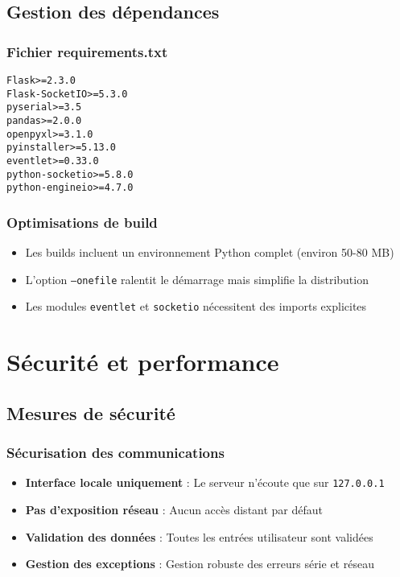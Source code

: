 \documentclass[12pt,a4paper]{article}
\begin{document}
\subsection{Gestion des dépendances}

\subsubsection{Fichier requirements.txt}

\begin{lstlisting}[caption=Dépendances Python]
Flask>=2.3.0
Flask-SocketIO>=5.3.0
pyserial>=3.5
pandas>=2.0.0
openpyxl>=3.1.0
pyinstaller>=5.13.0
eventlet>=0.33.0
python-socketio>=5.8.0
python-engineio>=4.7.0
\end{lstlisting}

\subsubsection{Optimisations de build}

\begin{warningbox}
\begin{itemize}
    \item Les builds incluent un environnement Python complet (environ 50-80 MB)
    \item L'option \texttt{--onefile} ralentit le démarrage mais simplifie la distribution
    \item Les modules \texttt{eventlet} et \texttt{socketio} nécessitent des imports explicites
\end{itemize}
\end{warningbox}

\section{Sécurité et performance}

\subsection{Mesures de sécurité}

\subsubsection{Sécurisation des communications}

\begin{itemize}
    \item \textbf{Interface locale uniquement} : Le serveur n'écoute que sur \texttt{127.0.0.1}
    \item \textbf{Pas d'exposition réseau} : Aucun accès distant par défaut
    \item \textbf{Validation des données} : Toutes les entrées utilisateur sont validées
    \item \textbf{Gestion des exceptions} : Gestion robuste des erreurs série et réseau
\end{itemize}
\end{document}
